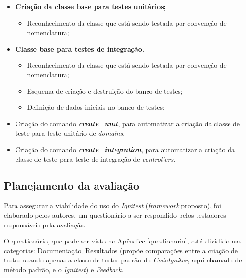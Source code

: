       
    \begin{itemize}
      
        \item \textbf{Criação da classe base para testes unitários;}
    
            \begin{itemize}
              \item Reconhecimento da classe que está sendo testada por convenção de nomenclatura;

            \end{itemize}
     
        \item \textbf{Classe base para testes de integração.}
    
            \begin{itemize}
              \item Reconhecimento da classe que está sendo testada por convenção de nomenclatura;
              \item Esquema de criação e destruição do banco de testes;
              \item Definição de dados iniciais no banco de testes;
            
            \end{itemize}
    
        \item Criação do comando \textit{\textbf{create\_unit}}, para automatizar a criação da classe de teste para teste unitário de \textit{domains}.
        
        \item Criação do comando \textit{\textbf{create\_integration}}, para automatizar a criação da classe de teste para teste de integração de \textit{controllers}.
    
    \end{itemize}

    \subsection{Planejamento da avaliação}

     Para assegurar a viabilidade do uso do \textit{Ignitest} (\textit{framework} proposto), foi elaborado pelos autores, um questionário a ser respondido pelos testadores responsáveis pela avaliação.
    
      O questionário, que pode ser visto no Apêndice \ref{questionario}, está dividido nas categorias: Documentação, Resultados (propõe comparações entre a criação de testes usando apenas a classe de testes padrão do \textit{CodeIgniter}, aqui chamado de método padrão, e o \textit{Ignitest}) e \textit{Feedback}.


